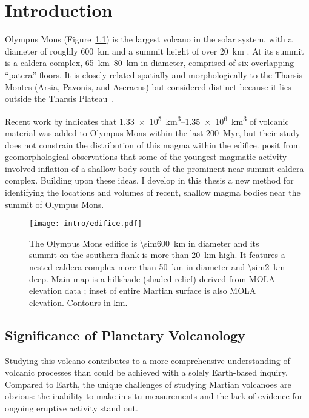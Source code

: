 \chapter{Introduction}\label{cha:intro}

Olympus Mons (Figure~\ref{fig:edifice}) is the largest volcano in the solar system, with a diameter of roughly \qty{600}{\km} and a summit height of over \qty{20}{\km} \parencite[e.g.,][]{plescia_morphometric_2004}. At its summit is a caldera complex, \qtyrange{65}{80}{\km} in diameter, comprised of six overlapping ``patera'' floors. It is closely related spatially and morphologically to the Tharsis Montes (Arsia, Pavonis, and Ascraeus) but considered distinct because it lies outside the Tharsis Plateau~\parencite[e.g.,][]{carr_volcanism_1973}.

Recent work by \textcite{chadwick_late_2015} indicates that \qtyrange{1.33e5}{1.35e6}{\km\cubed} of volcanic material was added to Olympus Mons within the last \qty{200}{Myr}, but their study does not constrain the distribution of this magma within the edifice. \textcite{mouginis-mark_late-stage_2019} posit from geomorphological observations that some of the youngest magmatic activity involved inflation of a shallow body south of the prominent near-summit caldera complex. Building upon these ideas, I develop in this thesis a new method for identifying the locations and volumes of recent, shallow magma bodies near the summit of Olympus Mons.

\begin{figure}
    \centering
    \texttt{[image: intro/edifice.pdf]}
    \caption[Olympus Mons]{The Olympus Mons edifice is \qty{\sim600}{\km} in diameter and its summit on the southern flank is more than \qty{20}{\km} high. It features a nested caldera complex more than \qty{50}{\km} in diameter and \qty{\sim2}{\km} deep. Main map is a hillshade (shaded relief) derived from \acf{MOLA} elevation data \parencite{smith_mars_2001}; inset of entire Martian surface is also \acs{MOLA} elevation. Contours in \unit{\km}.}\label{fig:edifice}
\end{figure}

\section{Significance of Planetary Volcanology}

Studying this volcano contributes to a more comprehensive understanding of volcanic processes than could be achieved with a solely Earth-based inquiry. Compared to Earth, the unique challenges of studying Martian volcanoes are obvious: the inability to make in-situ measurements and the lack of evidence for ongoing eruptive activity stand out. 

